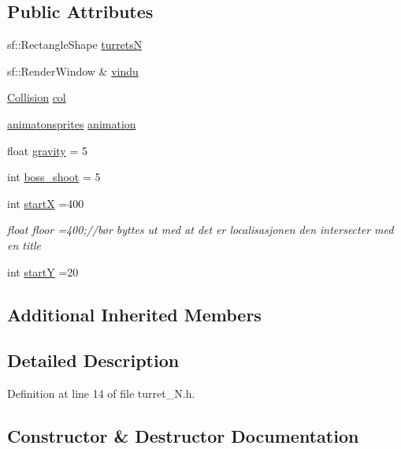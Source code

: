 \subsection*{Public Attributes}
\begin{DoxyCompactItemize}
\item 
sf\+::\+Rectangle\+Shape \hyperlink{classturret___n_a6edaacb80428d92f25c1a30a67c45ae4}{turretsN}
\item 
sf\+::\+Render\+Window \& \hyperlink{classturret___n_aea8c82bfa73c265828e06d1f34d2bd25}{vindu}
\item 
\hyperlink{class_collision}{Collision} \hyperlink{classturret___n_a47ca04d396895b039912283c18455ef1}{col}
\item 
\hyperlink{classanimatonsprites}{animatonsprites} \hyperlink{classturret___n_aaafd6b92320764ee7eac2554ad79dbc8}{animation}
\item 
float \hyperlink{classturret___n_aa3666332ec632f9f9262706819651f2d}{gravity} = 5
\item 
int \hyperlink{classturret___n_aa03c9565d470def091f734fd03fb0c05}{boss\+\_\+shoot} = 5
\item 
int \hyperlink{classturret___n_abce9e96f486c4f2144c7d23f605c20d0}{startX} =400
\begin{DoxyCompactList}\small\item\em float floor =400;//bør byttes ut med at det er localisasjonen den intersecter med en title \end{DoxyCompactList}\item 
int \hyperlink{classturret___n_afe109f7f624c558205ab3bae289005e8}{startY} =20
\end{DoxyCompactItemize}
\subsection*{Additional Inherited Members}


\subsection{Detailed Description}


Definition at line 14 of file turret\+\_\+\+N.\+h.



\subsection{Constructor \& Destructor Documentation}
\hypertarget{classturret___n_a3025a90c280327763fe979a5e36aada3}{}\label{classturret___n_a3025a90c280327763fe979a5e36aada3} 
